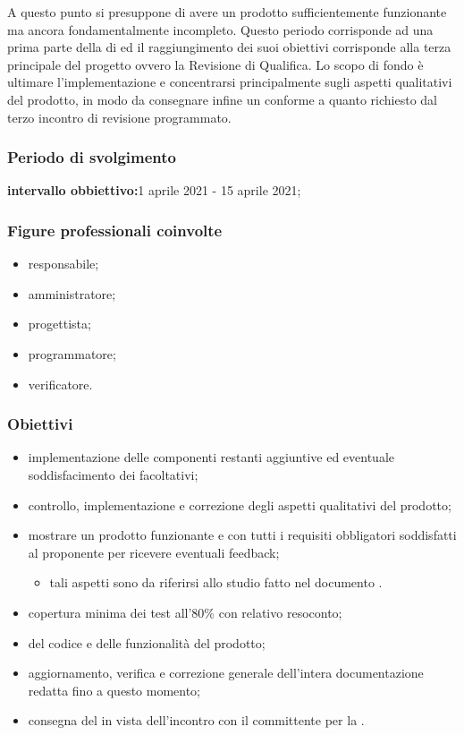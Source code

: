 A questo punto si presuppone di avere un prodotto sufficientemente funzionante ma ancora fondamentalmente incompleto. Questo periodo corrisponde ad una prima parte della  di  ed il raggiungimento dei suoi obiettivi corrisponde alla terza  principale del progetto ovvero la Revisione di Qualifica. Lo scopo di fondo è ultimare l'implementazione e concentrarsi principalmente sugli aspetti qualitativi del prodotto, in modo da consegnare infine un  conforme a quanto richiesto dal terzo incontro di revisione programmato.
        
        \subsubsection{Periodo di svolgimento}
        \textbf{intervallo obbiettivo:}1 aprile 2021 - 15 aprile 2021;
        
        \subsubsection{Figure professionali coinvolte}
            \begin{itemize}
                \item responsabile;
                \item amministratore;
                \item progettista;
                \item programmatore;
                \item verificatore.
            \end{itemize}

        \subsubsection{Obiettivi}
        \begin{itemize}
            \item implementazione delle componenti restanti aggiuntive ed eventuale soddisfacimento dei  facoltativi;
            \item controllo, implementazione e correzione degli aspetti qualitativi del prodotto;
            \item mostrare un prodotto funzionante e con tutti i requisiti obbligatori soddisfatti al proponente per ricevere eventuali feedback;
            \begin{itemize}
                \item tali aspetti sono da riferirsi allo studio fatto nel documento \PdQ{}. %
            \end{itemize}
            \item copertura minima dei test all'80\% con relativo resoconto;
            \item {} del codice e delle funzionalità del prodotto;
            \item aggiornamento, verifica e correzione generale dell'intera documentazione redatta fino a questo momento;
            \item consegna del  in vista dell'incontro con il committente per la \RQ{}.
        \end{itemize}